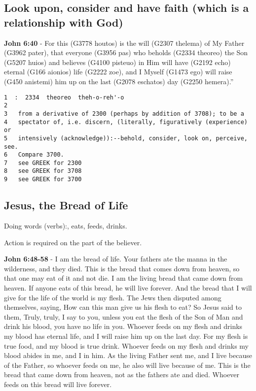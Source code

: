 \documentclass[11pt]{article}
\begin{document}
\subsection{Look upon, consider and have faith (which is a relationship with God)}
\label{sec:org07d4f86}
\textbf{John 6:40} - For this (G3778 houtos) is the will (G2307 thelema) of My Father (G3962 pater), that everyone (G3956 pas) who beholds (G2334 theoreo) the Son (G5207 huios) and believes (G4100 pisteuo) in Him will have (G2192 echo) eternal (G166 aionios) life (G2222 zoe), and I Myself (G1473 ego) will raise (G450 anistemi) him up on the last (G2078 eschatos) day (G2250 hemera).”

\begin{verbatim}
1  :  2334  theoreo  theh-o-reh'-o
2  
3   from a derivative of 2300 (perhaps by addition of 3708); to be a
4   spectator of, i.e. discern, (literally, figuratively (experience) or
5   intensively (acknowledge)):--behold, consider, look on, perceive, see.
6   Compare 3700.
7   see GREEK for 2300
8   see GREEK for 3708
9   see GREEK for 3700
\end{verbatim}

\subsection{Jesus, the Bread of Life}
\label{sec:orgb1492ae}
Doing words (verbs):, eats, feeds, drinks.

Action is required on the part of the believer.

\textbf{John 6:48-58} - I am the bread of life. Your fathers ate the manna in the wilderness, and they died. This is the bread that comes down from heaven, so that one may eat of it and not die. I am the living bread that came down from heaven. If anyone eats of this bread, he will live forever. And the bread that I will give for the life of the world is my flesh. The Jews then disputed among themselves, saying, How can this man give us his flesh to eat? So Jesus said to them, Truly, truly, I say to you, unless you eat the flesh of the Son of Man and drink his blood, you have no life in you. Whoever feeds on my flesh and drinks my blood has eternal life, and I will raise him up on the last day. For my flesh is true food, and my blood is true drink. Whoever feeds on my flesh and drinks my blood abides in me, and I in him. As the living Father sent me, and I live because of the Father, so whoever feeds on me, he also will live because of me. This is the bread that came down from heaven, not as the fathers ate and died. Whoever feeds on this bread will live forever.
\end{document}

